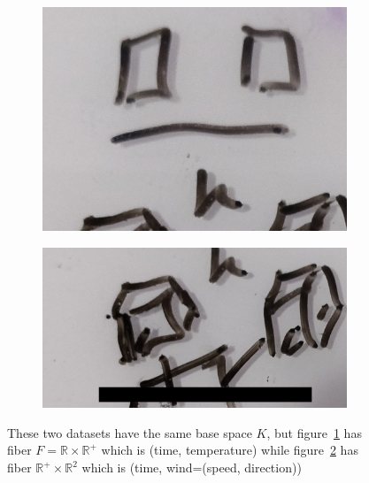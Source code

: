 \documentclass[../main.tex]{subfiles}
\begin{document}
\begin{figure}[H]
    \begin{subfigure}{.5\textwidth}
        \includegraphics[width=\textwidth]{figures/math/temp_2f.png}
        \caption{}
        \label{fig:fiber_example_plane}
    \end{subfigure}
    \begin{subfigure}{.5\textwidth}
        \includegraphics[width=\textwidth]{figures/math/temp_3f.png}
        \caption{}
        \label{fig:fiber_example_cube}
    \end{subfigure}
    \caption{These two datasets have the same base space $K$, but figure~\ref{fig:fiber_example_plane} has fiber  $F=\mathbb{R}\times\mathbb{R}^+$ which is (time, temperature) while figure~\ref{fig:fiber_example_cube} has fiber $\mathbb{R}^{+}\times\mathbb{R}^2$ which is (time, wind=(speed, direction))}
    \label{fig:data_fiber_example}
\end{figure}
\end{document}
